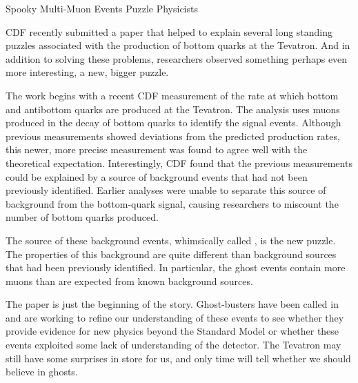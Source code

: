 \begin{MyArticle}[enhanced, tikz={rotate=0}, width=0.25\textwidth]{Spooky Multi-Muon Events Puzzle Physicists}
  \begin{multicols}{2}
    CDF recently submitted a paper that helped to explain several long
    standing puzzles associated with the production of bottom quarks
    at the Tevatron. And in addition to solving these problems,
    researchers observed something perhaps even more interesting, a
    new, bigger puzzle. 
    
    The work begins with a recent CDF measurement of the rate at which
    bottom and antibottom quarks are produced at the Tevatron. The
    analysis uses muons produced in the decay of bottom quarks to identify
    the signal events. Although previous measurements showed deviations
    from the predicted production rates, this newer, more precise
    measurement was found to agree well with the theoretical
    expectation. Interestingly, CDF found that the previous measurements
    could be explained by a source of background events that had not been
    previously identified. Earlier analyses were unable to separate this
    source of background from the bottom-quark signal, causing researchers
    to miscount the number of bottom quarks produced. 
    
    The source of these background events, whimsically called , is the new puzzle. The properties of this background are
    quite different than background sources that had been previously
    identified. In particular, the ghost events contain more muons than
    are expected from known background sources. 
    
    The paper is just the beginning of the story. Ghost-busters have been
    called in and are working to refine our understanding of these events
    to see whether they provide evidence for new physics beyond the
    Standard Model or whether these events exploited some lack of
    understanding of the detector. The Tevatron may still have some
    surprises in store for us, and only time will tell whether we should
    believe in ghosts.
    

\end{multicols}
\end{MyArticle}

